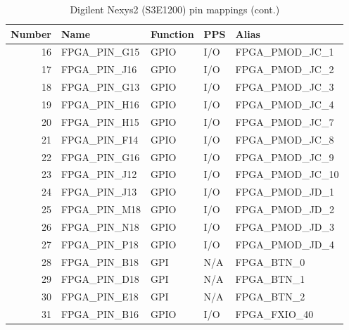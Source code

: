 \begin{table}[H]
\begin{center}
\begin{tabularx}{14cm}{rlllX}
Number & Name & Function & PPS & Alias \\
\hline

16 & FPGA\_PIN\_G15  & GPIO & I/O & FPGA\_PMOD\_JC\_1 \\
17 & FPGA\_PIN\_J16  & GPIO & I/O & FPGA\_PMOD\_JC\_2 \\
18 & FPGA\_PIN\_G13  & GPIO & I/O & FPGA\_PMOD\_JC\_3 \\
19 & FPGA\_PIN\_H16  & GPIO & I/O & FPGA\_PMOD\_JC\_4 \\

20 & FPGA\_PIN\_H15  & GPIO & I/O & FPGA\_PMOD\_JC\_7 \\
21 & FPGA\_PIN\_F14  & GPIO & I/O & FPGA\_PMOD\_JC\_8 \\
22 & FPGA\_PIN\_G16  & GPIO & I/O & FPGA\_PMOD\_JC\_9 \\
23 & FPGA\_PIN\_J12  & GPIO & I/O & FPGA\_PMOD\_JC\_10 \\

24 & FPGA\_PIN\_J13  & GPIO & I/O & FPGA\_PMOD\_JD\_1 \\
25 & FPGA\_PIN\_M18  & GPIO & I/O & FPGA\_PMOD\_JD\_2 \\
26 & FPGA\_PIN\_N18  & GPIO & I/O & FPGA\_PMOD\_JD\_3 \\
27 & FPGA\_PIN\_P18  & GPIO & I/O & FPGA\_PMOD\_JD\_4 \\

28 & FPGA\_PIN\_B18  & GPI & N/A & FPGA\_BTN\_0 \\
29 & FPGA\_PIN\_D18  & GPI & N/A & FPGA\_BTN\_1 \\
30 & FPGA\_PIN\_E18  & GPI & N/A & FPGA\_BTN\_2 \\
31 & FPGA\_PIN\_B16  & GPIO & I/O & FPGA\_FXIO\_40 \\
\end{tabularx}
\caption{Digilent Nexys2 (S3E1200) pin mappings (cont.)}
\end{center}
\end{table}

